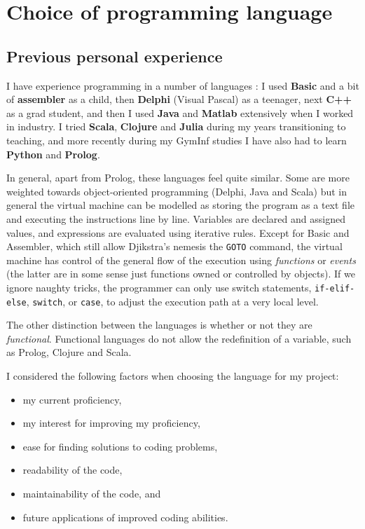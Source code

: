 \documentclass[10pt]{article}
\begin{document}
\section{Choice of programming language} \label{language}

\subsection{Previous personal experience}

I have experience programming in a number of languages : I used \textbf{Basic} and a bit of \textbf{assembler} as a child, then \textbf{Delphi} (Visual Pascal) as a teenager, next \textbf{C++} as a grad student, and then I used \textbf{Java} and \textbf{Matlab} extensively when I worked in industry. I tried \textbf{Scala}, \textbf{Clojure} and \textbf{Julia} during my years transitioning to teaching, and more recently during my GymInf studies I have also had to learn \textbf{Python} and \textbf{Prolog}.

In general, apart from Prolog, these languages feel quite similar. Some are more weighted towards object-oriented programming (Delphi, Java and Scala) but in general the virtual machine can be modelled as storing the program as a text file and executing the instructions line by line. Variables are declared and assigned values, and expressions are evaluated using iterative rules. Except for Basic and Assembler, which still allow Djikstra's nemesis the \texttt{GOTO} command, the virtual machine has control of the general flow of the execution using \emph{functions} or \emph{events} (the latter are in some sense just functions owned or controlled by objects). If we ignore naughty tricks, the programmer can only use switch statements, \texttt{if-elif-else}, \texttt{switch}, or \texttt{case}, to adjust the execution path at a very local level.

The other distinction between the languages is whether or not they are \emph{functional}. Functional languages do not allow the redefinition of a variable, such as Prolog, Clojure and Scala. 

I considered the following factors when choosing the language for my project:
\begin{itemize}
\item my current proficiency,
\item my interest for improving my proficiency,
\item ease for finding solutions to coding problems,
\item readability of the code,
\item maintainability of the code, and
\item future applications of improved coding abilities.
\end{itemize}
\end{document}

